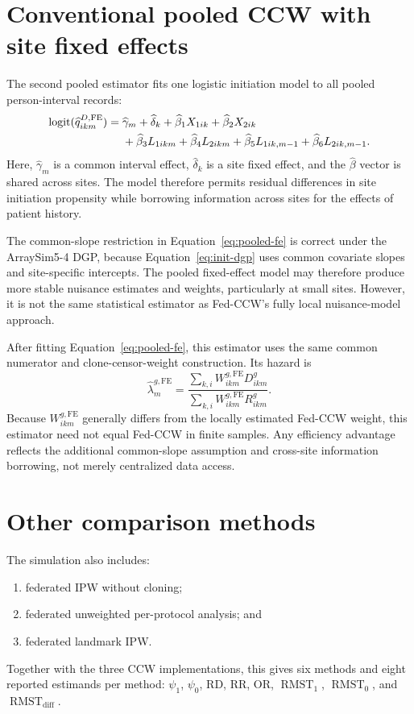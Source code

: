 \documentclass[11pt]{article}
\newcommand{\RMST}{\operatorname{RMST}}
\begin{document}
\section{Conventional pooled CCW with site fixed effects}

The second pooled estimator fits one logistic initiation model to all pooled
person-interval records:
\begin{align}
\label{eq:pooled-fe}
  \operatorname{logit}(\widehat q^{D,\mathrm{FE}}_{ikm})
  ={}&\widehat\gamma_m+\widehat\delta_k
      +\widehat\beta_1X_{1ik}+\widehat\beta_2X_{2ik} \notag\\
     &+\widehat\beta_3L_{1ikm}+\widehat\beta_4L_{2ikm}
      +\widehat\beta_5L_{1ik,m-1}
      +\widehat\beta_6L_{2ik,m-1}.
\end{align}
Here, $\widehat\gamma_m$ is a common interval effect,
$\widehat\delta_k$ is a site fixed effect, and the $\widehat\beta$ vector is
shared across sites. The model therefore permits residual differences in site
initiation propensity while borrowing information across sites for the
effects of patient history.

The common-slope restriction in Equation~\eqref{eq:pooled-fe} is correct under
the ArraySim5-4 DGP, because Equation~\eqref{eq:init-dgp} uses common covariate
slopes and site-specific intercepts. The pooled fixed-effect model may
therefore produce more stable nuisance estimates and weights, particularly at
small sites. However, it is not the same statistical estimator as Fed-CCW's
fully local nuisance-model approach.

After fitting Equation~\eqref{eq:pooled-fe}, this estimator uses the same
common numerator and clone-censor-weight construction. Its hazard is
\[
  \widehat\lambda_m^{g,\mathrm{FE}}
  =\frac{\sum_{k,i}W^{g,\mathrm{FE}}_{ikm}D^g_{ikm}}
         {\sum_{k,i}W^{g,\mathrm{FE}}_{ikm}R^g_{ikm}}.
\]
Because $W^{g,\mathrm{FE}}_{ikm}$ generally differs from the locally estimated
Fed-CCW weight, this estimator need not equal Fed-CCW in finite samples. Any
efficiency advantage reflects the additional common-slope assumption and
cross-site information borrowing, not merely centralized data access.

\section{Other comparison methods}

The simulation also includes:
\begin{enumerate}[leftmargin=2em]
  \item federated IPW without cloning;
  \item federated unweighted per-protocol analysis; and
  \item federated landmark IPW.
\end{enumerate}
Together with the three CCW implementations, this gives six methods and eight
reported estimands per method: $\psi_1$, $\psi_0$, RD, RR, OR, $\RMST_1$,
$\RMST_0$, and $\RMST_{\mathrm{diff}}$.
\end{document}
